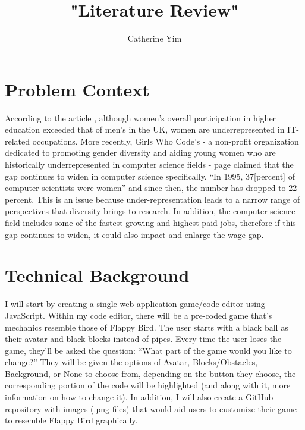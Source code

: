 \documentclass[10pt,twocolumn]{article}
\title{"Literature Review"}
\author{Catherine Yim}
\affiliation{Occidental College}
\begin{document}
\maketitle

\section{Problem Context}
According to the article  \cite{cleggtrayhurn2000}
, although women’s overall participation in higher education exceeded that of men’s in the UK, women are underrepresented in IT-related occupations. More recently, Girls Who Code's - a non-profit organization dedicated to promoting gender diversity and aiding young women who are historically underrepresented in computer science fields -  \cite{girlswhocode2021} page claimed that the gap continues to widen in computer science specifically. “In 1995, 37[percent] of computer scientists were women” and since then, the number has dropped to 22 percent.
This is an issue because under-representation leads to a narrow range of perspectives that diversity brings to research. In addition, the computer science field includes some of the fastest-growing and highest-paid jobs, therefore if this gap continues to widen, it could also impact and enlarge the wage gap.


\section{Technical Background}
I will start by creating a single web application game/code editor using JavaScript. Within my code editor, there will be a pre-coded game that’s mechanics resemble those of Flappy Bird. The user starts with a black ball as their avatar and black blocks instead of pipes. Every time the user loses the game, they’ll be asked the question: “What part of the game would you like to change?” They will be given the options of Avatar, Blocks/Obstacles, Background, or None to choose from, depending on the button they choose, the corresponding portion of the code will be highlighted (and along with it, more information on how to change it). In addition, I will also create a GitHub repository with images (.png files) that would aid users to customize their game to resemble Flappy Bird graphically. 
\end{document}
